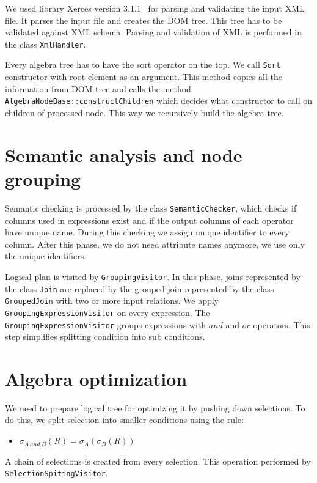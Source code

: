 We used library Xerces version 3.1.1~\cite{xerces} for parsing and validating the input XML file. It parses the input file and creates the DOM tree. This tree has to be validated against XML schema. Parsing and validation of XML is performed in the class \texttt{XmlHandler}.

Every algebra tree has to have the sort operator on the top. We call \texttt{Sort} constructor with root element as an argument. This method copies all the information from DOM tree and calls the method \texttt{AlgebraNodeBase::constructChildren} which decides what constructor to call on children of processed node. This way we recursively build the algebra tree.



\section{Semantic analysis and node grouping}

Semantic checking is processed by the class \texttt{SemanticChecker}, which checks if columns used in expressions exist and if the output columns of each operator have unique name. During this checking we assign unique identifier to every column. After this phase, we do not need attribute names anymore, we use only the unique identifiers.

Logical plan is visited by \texttt{GroupingVisitor}. In this phase, joins represented by the class \texttt{Join} are replaced by the grouped join represented by the class \texttt{GroupedJoin} with two or more input relations. We apply \texttt{Grouping\-Expression\-Visitor} on every expression. The \texttt{GroupingExpressionVisitor} groups expressions with $and$ and $or$ operators. This step simplifies splitting condition into sub conditions.

\section{Algebra optimization}

We need to prepare logical tree for optimizing it by pushing down selections. To do this, we split selection into smaller conditions using the rule:
\begin{itemize}
\item $\sigma_{A~and~B}(R)=\sigma_{A}(\sigma_{B}(R))$
\end{itemize}
A chain of selections is created from every selection. This operation performed by \texttt{SelectionSpitingVisitor}.

